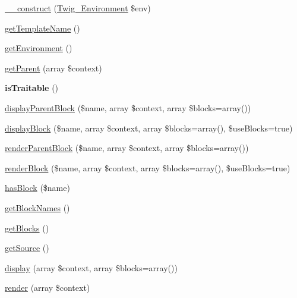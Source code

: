 \begin{DoxyCompactItemize}
\item 
\hyperlink{class_twig___template_a4f8326243132c1450a81e0a817aa1be7}{\+\_\+\+\_\+construct} (\hyperlink{class_twig___environment}{Twig\+\_\+\+Environment} \$env)
\item 
\hyperlink{class_twig___template_a621a3ccd148ed8b9e937da6959c98f39}{get\+Template\+Name} ()
\item 
\hyperlink{class_twig___template_a1a945689f9a90f9029d671ec32262d37}{get\+Environment} ()
\item 
\hyperlink{class_twig___template_a4217d54e053aa5bddfad17b3004ac5c1}{get\+Parent} (array \$context)
\item 
{\bfseries is\+Traitable} ()\hypertarget{class_twig___template_aa9eb89be270f6afc256ef5e272b78a63}{}\label{class_twig___template_aa9eb89be270f6afc256ef5e272b78a63}

\item 
\hyperlink{class_twig___template_a78d5485612f79bf31635bb68a7b7de13}{display\+Parent\+Block} (\$name, array \$context, array \$blocks=array())
\item 
\hyperlink{class_twig___template_a97ea25cc61cdde9281668bf860771c94}{display\+Block} (\$name, array \$context, array \$blocks=array(), \$use\+Blocks=true)
\item 
\hyperlink{class_twig___template_a7c48e16aed21e0e9ea0d9bfbf6528a72}{render\+Parent\+Block} (\$name, array \$context, array \$blocks=array())
\item 
\hyperlink{class_twig___template_a39ed303baa07a0f8d7dc26d1ecc39fb9}{render\+Block} (\$name, array \$context, array \$blocks=array(), \$use\+Blocks=true)
\item 
\hyperlink{class_twig___template_ade38e8b97bc678e012017eaec7594585}{has\+Block} (\$name)
\item 
\hyperlink{class_twig___template_ad3fa0b6c6a34ecc42f64666da6c9c017}{get\+Block\+Names} ()
\item 
\hyperlink{class_twig___template_a14e746abf913beb2363836303549228d}{get\+Blocks} ()
\item 
\hyperlink{class_twig___template_a42fdd8313c99d9c5f80219c1e192b93a}{get\+Source} ()
\item 
\hyperlink{class_twig___template_a056b93bf930a9629d3a96234ce462f20}{display} (array \$context, array \$blocks=array())
\item 
\hyperlink{class_twig___template_a09fce96a9866b9a2bcba80d611c0199c}{render} (array \$context)
\end{DoxyCompactItemize}
